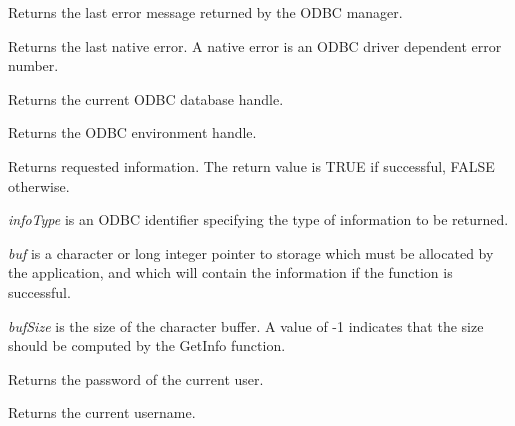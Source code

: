 

Returns the last error message returned by the ODBC manager.



Returns the last native error. A native error is an ODBC driver dependent
error number.



Returns the current ODBC database handle.



Returns the ODBC environment handle. 




Returns requested information. The return value is TRUE if successful, FALSE otherwise.

{\it infoType} is an ODBC identifier specifying the type of information to be returned.

{\it buf} is a character or long integer pointer to storage which must be allocated by the
application, and which will contain the information if the function is successful.

{\it bufSize} is the size of the character buffer. A value of -1 indicates that the size
should be computed by the GetInfo function.



Returns the password of the current user.



Returns the current username.



